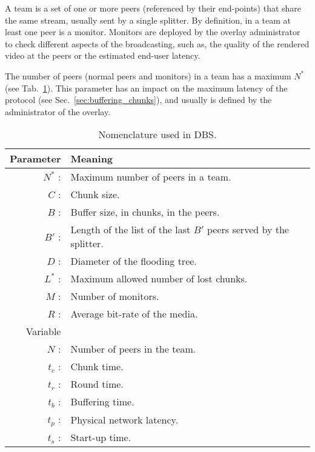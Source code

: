 

\label{sec:team_def}

A team is a set of one or more peers (referenced by their end-points)
that share the same stream, usually sent by a single splitter. By
definition, in a team at least one peer is a \gls{monitor}. Monitors
are deployed by the overlay administrator to check different aspects
of the broadcasting, such as, the quality of the rendered video at the
peers or the estimated end-user latency.

The number of peers (normal peers and monitors) in a team has a
maximum $N^*$ (see Tab.~\ref{tab:DBS_nomenclature}). This parameter
has an impact on the maximum latency of the protocol (see
Sec.~\ref{sec:buffering_chunks}), and usually is defined by the
administrator of the overlay.

\begin{table}[t]
  \centering
  \begin{tabular}{rl}
    Parameter & Meaning \\
    \hline
    $N^*$ :  & Maximum number of peers in a team. \\
    $C$ :    & Chunk size. \\
    $B$ :    & Buffer size, in chunks, in the peers. \\
    $B'$ :   & Length of the list of the last $B'$ peers served by the splitter. \\ 
    $D$ :    & Diameter of the flooding tree. \\
    $L^*$ :  & Maximum allowed number of lost chunks. \\
    $M$ :    & Number of monitors. \\
    $R$ :    & Average bit-rate of the media. \\
    Variable & \\
    \hline
    $N$ :    & Number of peers in the team. \\
    $t_c$ :  & Chunk time. \\
    $t_r$ :  & Round time. \\
    $t_b$ :  & Buffering time. \\
    $t_p$ :  & Physical network latency. \\
    $t_s$ :  & Start-up time.
  \end{tabular}
  \caption{Nomenclature used in DBS.} %
  \label{tab:DBS_nomenclature}
\end{table}

